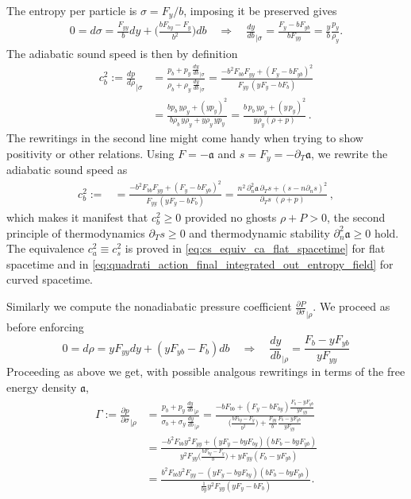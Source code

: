 The entropy per particle is $\sigma=F_y/b$, imposing it be preserved gives
\begin{align}
    0=d\sigma = \frac{F_{yy}}{b}dy+\Big(\frac{bF_{by}-F_y}{b^2}\Big)db\quad \Rightarrow\quad \frac{dy}{db}_{\mid\sigma}= \frac{F_y-b F_{yb}}{bF_{yy}}=\frac{y}{b}\frac{p_y}{\rho_y}.
\end{align}
The adiabatic sound speed is then by definition
\begin{align}
    c_b^2:=\frac{dp}{d\rho}_{\mid\sigma}&=\frac{p_b + p_y\, \tfrac{dy}{db}_{\mid\sigma}}{\rho_b + \rho_y\, \tfrac{dy}{db}_{\mid\sigma}} 
    =\frac{-b^2F_{bb} F_{yy}+(F_y-bF_{yb})^2}{F_{yy}\,(yF_y-bF_b)}\\[5pt]
    &= \frac{b p_b\, y\rho_y+(yp_y)^2}{b\rho_b\,y\rho_y+y\rho_y\,yp_y} = \frac{b\,p_b \,y\rho_y + (y\,p_y)^2}{y \rho_y (\rho+p)}\,.
\end{align}
The rewritings in the second line might come handy when trying to show positivity or other relations.
Using $F=-\mathfrak{a}$ and $s=F_y=-\partial_T\mathfrak{a}$, we rewrite the adiabatic sound speed as
\begin{align}
    c_b^2:=
    &=\frac{-b^2F_{bb} F_{yy}+(F_y-bF_{yb})^2}{F_{yy}\,(yF_y-bF_b)} = \frac{n^2\,\partial_n^2\mathfrak{a}\,\partial_Ts + (s-n\partial_ns)^2}{\partial_Ts\,\,(\rho+p)}\,,
\end{align}
which makes it manifest that $c_b^2\geq0$ provided no ghosts $\rho+P>0$, the second principle of thermodynamics $\partial_Ts\geq 0$ and thermodynamic stability $\partial_n^2\mathfrak{a}\geq 0$ hold.
The equivalence $c_a^2\equiv c_s^2$ is proved in \eqref{eq:cs_equiv_ca_flat_spacetime} for flat spacetime and in \eqref{eq:quadrati_action_final_integrated_out_entropy_field} for curved spacetime.

Similarly we compute the nonadiabatic pressure coefficient $\frac{\partial P}{\partial \sigma}_{|\rho}$.
We proceed as before enforcing 
\begin{equation}
    0=d\rho=yF_{yy}dy+(yF_{yb}-F_b)db\quad \Rightarrow\quad \frac{dy}{db}_{|\rho}=\frac{F_b-yF_{yb}}{yF_{yy}}
\end{equation}
Proceeding as above we get, with possible analgous rewritings in terms of the free energy density $\mathfrak{a}$,
{\small
\begin{align}\label{eq:nonadiabatic_pressure_coefficient_gamma}
\begin{aligned}
    \Gamma:=\frac{\partial p}{\partial \sigma}_{\mid\rho}&=\frac{p_b + p_y\, \tfrac{dy}{db}_{\mid\rho}}{\sigma_b + \sigma_y\, \tfrac{dy}{db}_{\mid\rho}}=\frac{-bF_{bb}+(F_y-bF_{by})\tfrac{F_b-yF_{yb}}{yF_{yy}}}{\Big(\tfrac{bF_{by}-F_y}{b^2}\Big)+\tfrac{F_{yy}}{b}\frac{F_b-yF_{yb}}{yF_{yy}}}
    \\
    &=\frac{-b^2F_{bb}y^2F_{yy}+(yF_y-byF_{by})(bF_b-byF_{yb})}{y^2F_{yy}\Big(\tfrac{bF_{by}-F_y}{b}\Big)+yF_{yy}(F_b-yF_{yb})}
    \\
    &=\frac{b^2F_{bb}y^2F_{yy}-(yF_y-byF_{by})(bF_b-byF_{yb})}{\tfrac{1}{by}y^2F_{yy}(yF_y-bF_b)}.
\end{aligned}\end{align}}



